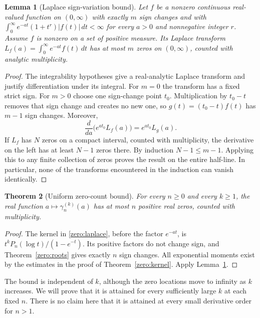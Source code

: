 \documentclass[11pt,a4paper]{article}
\newtheorem{theorem}{Theorem}[section]
\newtheorem{lemma}[theorem]{Lemma}
\theoremstyle{definition}
\theoremstyle{remark}
\numberwithin{equation}{section}
\begin{document}
\begin{lemma}[Laplace sign-variation bound]\label{zero:variation}
Let $f$ be a nonzero continuous real-valued function on $(0,\infty)$ with exactly
$m$ sign changes and with
$\int_0^\infty e^{-at}(1+t^r)|f(t)|\,dt<\infty$ for every $a>0$
and nonnegative integer $r$.  Assume $f$ is nonzero on a
set of positive measure.  Its Laplace transform
$L_f(a)=\int_0^\infty e^{-at}f(t)\,dt$ has at most $m$ zeros on
$(0,\infty)$, counted with analytic multiplicity.
\end{lemma}
\begin{proof}
The integrability hypotheses give a real-analytic Laplace transform
and justify differentiation under its integral.
For $m=0$ the transform has a fixed strict sign.  For $m>0$ choose
one sign-change point $t_0$.  Multiplication by $t_0-t$ removes
that sign change and creates no new one, so
$g(t)=(t_0-t)f(t)$ has $m-1$ sign changes.  Moreover,
\[
 \frac{d}{da}\bigl(e^{at_0}L_f(a)\bigr)=e^{at_0}L_g(a).
\]
If $L_f$ has $N$ zeros on a compact interval, counted with
multiplicity, the derivative on the left has at least $N-1$ zeros
there.  By induction $N-1\leq m-1$.  Applying this to any finite
collection of zeros proves the result on the entire half-line.
In particular, none of the transforms encountered in the induction
can vanish identically.
\end{proof}

\begin{theorem}[Uniform zero-count bound]\label{zero:at-most}
For every $n\geq0$ and every $k\geq1$, the real function
$a\mapsto\gamma_n^{(k)}(a)$ has at most $n$ positive real zeros,
counted with multiplicity.
\end{theorem}
\begin{proof}
The kernel in \eqref{zero:laplace}, before the factor $e^{-at}$,
is $t^kP_n(\log t)/(1-e^{-t})$.  Its positive factors do not change
sign, and Theorem~\ref{zero:roots} gives exactly $n$ sign changes.
All exponential moments exist by the estimates in the proof of
Theorem~\ref{zero:kernel}.  Apply Lemma~\ref{zero:variation}.
\end{proof}

The bound is independent of $k$, although the zero locations move to
infinity as $k$ increases.  We will prove that it is attained for
every sufficiently large $k$ at each fixed $n$.  There is no claim
here that it is attained at every small derivative order for $n>1$.
\end{document}
